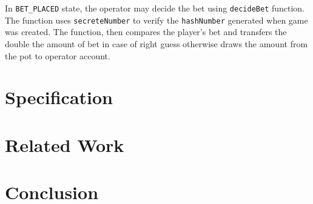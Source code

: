 \documentclass[a4paper,UKenglish,cleveref, autoref, thm-restate]{oasics-v2021}
\begin{document}
%
In \texttt{BET\_PLACED} state, the operator may decide the bet using \texttt{decideBet} function. 
%
The function uses \texttt{secreteNumber} to verify the \texttt{hashNumber} generated when game was created.
%
The function, then compares the player's bet and transfers the double the amount of bet in case of right guess otherwise draws the amount from the pot to operator account. 
%
%
%
%
%


%
%
%

%
%
%

%

\section{Specification}


\section{Related Work}
\section{Conclusion}



\end{document}

